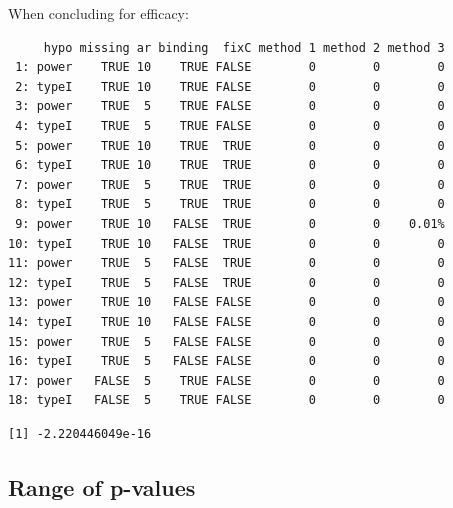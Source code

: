 \documentclass[12pt]{article}
\begin{document}
When concluding for efficacy:
\begin{verbatim}
     hypo missing ar binding  fixC method 1 method 2 method 3
 1: power    TRUE 10    TRUE FALSE        0        0        0
 2: typeI    TRUE 10    TRUE FALSE        0        0        0
 3: power    TRUE  5    TRUE FALSE        0        0        0
 4: typeI    TRUE  5    TRUE FALSE        0        0        0
 5: power    TRUE 10    TRUE  TRUE        0        0        0
 6: typeI    TRUE 10    TRUE  TRUE        0        0        0
 7: power    TRUE  5    TRUE  TRUE        0        0        0
 8: typeI    TRUE  5    TRUE  TRUE        0        0        0
 9: power    TRUE 10   FALSE  TRUE        0        0    0.01%
10: typeI    TRUE 10   FALSE  TRUE        0        0        0
11: power    TRUE  5   FALSE  TRUE        0        0        0
12: typeI    TRUE  5   FALSE  TRUE        0        0        0
13: power    TRUE 10   FALSE FALSE        0        0        0
14: typeI    TRUE 10   FALSE FALSE        0        0        0
15: power    TRUE  5   FALSE FALSE        0        0        0
16: typeI    TRUE  5   FALSE FALSE        0        0        0
17: power   FALSE  5    TRUE FALSE        0        0        0
18: typeI   FALSE  5    TRUE FALSE        0        0        0
\end{verbatim}

\begin{verbatim}
[1] -2.220446049e-16
\end{verbatim}




\subsection{Range of p-values}
\label{sec:orgcf1ffa0}
\end{document}
